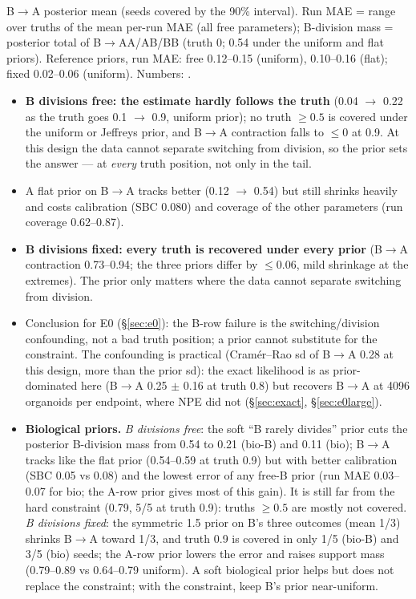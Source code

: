 \documentclass[10pt,a4paper]{article}
\newcommand{\res}[1]{\texttt{\detokenize{#1}}}  %
\newcommand{\blk}[1]{\par\needspace{5\baselineskip}\smallskip{\sffamily\bfseries\color{inkgray}#1}\par}
\newcommand{\Comment}{\blk{Comment}}
\begin{document}
\begin{center}
B$\to$A posterior mean (seeds covered by the 90\% interval). Run MAE = range over truths of the mean per-run MAE (all free parameters); B-division mass = posterior total of B$\to$AA/AB/BB (truth 0; 0.54 under the uniform and flat priors). Reference priors, run MAE: free 0.12--0.15 (uniform), 0.10--0.16 (flat); fixed 0.02--0.06 (uniform). Numbers: \res{tables/x5a.csv}.
\end{center}
\Comment
\begin{itemize}
\item \textbf{B divisions free: the estimate hardly follows the truth} (0.04 $\to$ 0.22 as the truth goes 0.1 $\to$ 0.9, uniform prior); no truth $\ge 0.5$ is covered under the uniform or Jeffreys prior, and B$\to$A contraction falls to $\le 0$ at 0.9. At this design the data cannot separate switching from division, so the prior sets the answer --- at \emph{every} truth position, not only in the tail.
\item A flat prior on B$\to$A tracks better (0.12 $\to$ 0.54) but still shrinks heavily and costs calibration (SBC 0.080) and coverage of the other parameters (run coverage 0.62--0.87).
\item \textbf{B divisions fixed: every truth is recovered under every prior} (B$\to$A contraction 0.73--0.94; the three priors differ by $\le 0.06$, mild shrinkage at the extremes). The prior only matters where the data cannot separate switching from division.
\item Conclusion for E0 (\S\ref{sec:e0}): the B-row failure is the switching/division confounding, not a bad truth position; a prior cannot substitute for the constraint. The confounding is practical (Cram\'er--Rao sd of B$\to$A 0.28 at this design, more than the prior sd): the exact likelihood is as prior-dominated here (B$\to$A 0.25 $\pm$ 0.16 at truth 0.8) but recovers B$\to$A at 4096 organoids per endpoint, where NPE did not (\S\ref{sec:exact}, \S\ref{sec:e0large}).
\item \textbf{Biological priors.} \emph{B divisions free}: the soft ``B rarely divides'' prior cuts the posterior B-division mass from 0.54 to 0.21 (bio-B) and 0.11 (bio); B$\to$A tracks like the flat prior (0.54--0.59 at truth 0.9) but with better calibration (SBC 0.05 vs 0.08) and the lowest error of any free-B prior (run MAE 0.03--0.07 for bio; the A-row prior gives most of this gain). It is still far from the hard constraint (0.79, 5/5 at truth 0.9): truths $\ge 0.5$ are mostly not covered. \emph{B divisions fixed}: the symmetric 1.5 prior on B's three outcomes (mean 1/3) shrinks B$\to$A toward 1/3, and truth 0.9 is covered in only 1/5 (bio-B) and 3/5 (bio) seeds; the A-row prior lowers the error and raises support mass (0.79--0.89 vs 0.64--0.79 uniform). A soft biological prior helps but does not replace the constraint; with the constraint, keep B's prior near-uniform.
\end{itemize}
\end{document}

